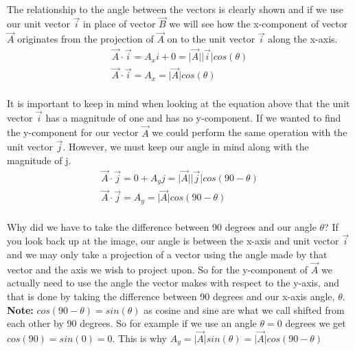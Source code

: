 \documentclass[12pt, letterpaper]{report}
\begin{document}
		\paragraph{} The relationship to the angle between the vectors is clearly shown and if we use our unit vector $\vec{i}$ in place of vector $\vec{B}$ we will see how the x-component of vector $\vec{A}$ originates from the projection of $\vec{A}$ on to the unit vector $\vec{i}$ along the x-axis.
		\begin{align*}
		\vec{A}\cdot\vec{i} = A_xi + 0 = \lvert\vec{A}\rvert\lvert\vec{i}\rvert cos\left(\theta\right) \\
		\vec{A}\cdot\vec{i} = A_x = \lvert\vec{A}\rvert cos\left(\theta\right)
		\end{align*}

		\paragraph{} It is important to keep in mind when looking at the equation above that the unit vector $\vec{i}$ has a magnitude of one and has no y-component. If we wanted to find the y-component for our vector $\vec{A}$ we could perform the same operation with the unit vector $\vec{j}$. However, we must keep our angle in mind along with the magnitude of j.
		\begin{align*}
		\vec{A}\cdot\vec{j} = 0 + A_yj=\lvert\vec{A}\rvert\lvert\vec{j}\rvert cos\left(90-\theta\right)\\
		\vec{A}\cdot\vec{j} = A_y = \lvert\vec{A}\rvert cos\left(90 - \theta\right)
		\end{align*}
		\paragraph{} Why did we have to take the difference between 90 degrees and our angle $\theta$? If you look back up at the image, our angle is between the x-axis and unit vector $\vec{i}$ and we may only take a projection of a vector using the angle made by that vector and the axis we wish to project upon. So for the y-component of $\vec{A}$ we actually need to use the angle the vector makes with respect to the y-axis, and that is done by taking the difference between 90 degrees and our x-axis angle, $\theta$. \textbf{Note:} $cos\left(90 - \theta\right) = sin\left(\theta\right)$ as cosine and sine are what we call shifted from each other by 90 degrees. So for example if we use an angle $\theta = 0$ degrees we get $cos\left(90\right)=sin\left(0\right)=0$. This is why $A_y = \lvert\vec{A}\rvert sin\left(\theta\right) = \lvert\vec{A}\rvert cos\left(90-\theta\right)$
\end{document}

